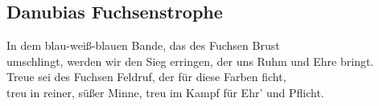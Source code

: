 
\subsection*{Danubias Fuchsenstrophe}
%

\thestrophe In dem blau-weiß-blauen Bande, das des Fuchsen Brust \\
umschlingt, werden wir den Sieg erringen, der uns Ruhm und Ehre bringt. \\ 
Treue sei des Fuchsen Feldruf, der für diese Farben ficht, \\
treu in reiner, süßer Minne, treu im Kampf für Ehr' und Pflicht.